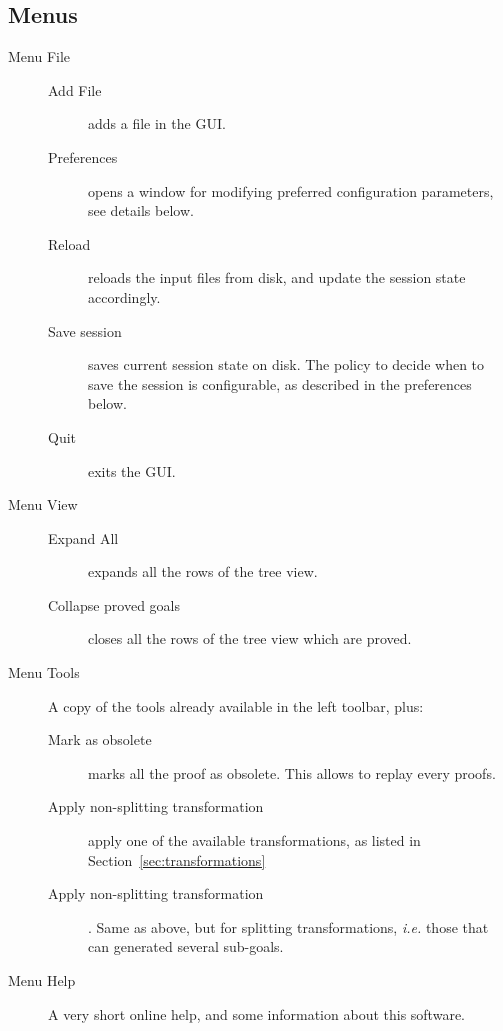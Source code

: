 \subsection{Menus}

\begin{description}
\item[Menu \textsf{File}]\emptyitem
\begin{description}
\item[Add File] adds a file in the GUI.
\item[Preferences] opens a window for modifying preferred
  configuration parameters, see details below.
\item[Reload] reloads the input files from disk, and update the session state accordingly.
\item[Save session] saves current session state on disk. The policy to decide when to save the session is configurable, as described in the preferences below.
\item[Quit] exits the GUI.
\end{description}

\item[Menu \textsf{View}]\emptyitem
\begin{description}
\item[Expand All] expands all the rows of the tree view.
\item[Collapse proved goals] closes all the rows of the tree view
  which are proved.
\end{description}

\item[Menu \textsf{Tools}]
A copy of the tools already available in the left toolbar, plus:
\begin{description}
\item[Mark as obsolete] marks all the proof as
  obsolete.
  This allows to replay every proofs.
\item[Apply non-splitting transformation] apply one of the available
  transformations, as listed in Section~\ref{sec:transformations}
\item[Apply non-splitting transformation]. Same as above, but for
  splitting transformations, \emph{i.e.} those that can generated
  several sub-goals. 
\end{description}

\item[Menu \textsf{Help}]
A very short online help, and some information about this software.
\end{description}

